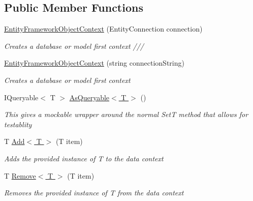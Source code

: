 \subsection*{Public Member Functions}
\begin{DoxyCompactItemize}
\item 
\hyperlink{class_highway_1_1_data_1_1_entity_framework_1_1_contexts_1_1_entity_framework_object_context_ab816a4104af7eb0d5d195d6caf091104}{Entity\-Framework\-Object\-Context} (Entity\-Connection connection)
\begin{DoxyCompactList}\small\item\em Creates a database or model first context /// \end{DoxyCompactList}\item 
\hyperlink{class_highway_1_1_data_1_1_entity_framework_1_1_contexts_1_1_entity_framework_object_context_a2f7eeefa09f448cdfa55eb6757ec9223}{Entity\-Framework\-Object\-Context} (string connection\-String)
\begin{DoxyCompactList}\small\item\em Creates a database or model first context \end{DoxyCompactList}\item 
I\-Queryable$<$ T $>$ \hyperlink{class_highway_1_1_data_1_1_entity_framework_1_1_contexts_1_1_entity_framework_object_context_a011a1a590b8a8687e70e09f78e371825}{As\-Queryable$<$ T $>$} ()
\begin{DoxyCompactList}\small\item\em This gives a mockable wrapper around the normal Set{\itshape T}  method that allows for testablity \end{DoxyCompactList}\item 
T \hyperlink{class_highway_1_1_data_1_1_entity_framework_1_1_contexts_1_1_entity_framework_object_context_a412a71e5dac9537827249d18a99484f9}{Add$<$ T $>$} (T item)
\begin{DoxyCompactList}\small\item\em Adds the provided instance of {\itshape T}  to the data context \end{DoxyCompactList}\item 
T \hyperlink{class_highway_1_1_data_1_1_entity_framework_1_1_contexts_1_1_entity_framework_object_context_af83b71e1b88c1b31d302f834602731c6}{Remove$<$ T $>$} (T item)
\begin{DoxyCompactList}\small\item\em Removes the provided instance of {\itshape T}  from the data context \end{DoxyCompactList}\item 

\end{DoxyCompactItemize}
